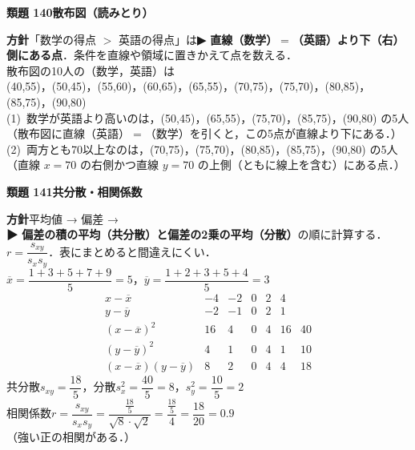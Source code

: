\documentclass[a4paper,11pt]{ltjsarticle}
\newcommand{\ans}[2]{\Needspace{5\baselineskip}\vspace{6pt}%
  {\sffamily\bfseries 類題 #1\quad #2}\par}
\newcommand{\point}[1]{\textsf{\bfseries ▶ #1}}
\begin{document}
\ans{140}{散布図（読みとり）}
\begin{kai}
\textbf{方針}\quad 「数学の得点 $>$ 英語の得点」は\point{直線（数学）$=$（英語）より下（右）側にある点}．条件を直線や領域に置きかえて点を数える．\\[2pt]
散布図の10人の（数学，英語）は\\
\hspace*{1.5em}(40,55)，(50,45)，(55,60)，(60,65)，(65,55)，(70,75)，(75,70)，(80,85)，(85,75)，(90,80)\\[2pt]
(1)\ 数学が英語より高いのは，(50,45)，(65,55)，(75,70)，(85,75)，(90,80) の\quad 5人\\
\hspace*{1.5em}（散布図に直線（英語）$=$（数学）を引くと，この5点が直線より下にある．）\\[2pt]
(2)\ 両方とも70以上なのは，(70,75)，(75,70)，(80,85)，(85,75)，(90,80) の\quad 5人\\
\hspace*{1.5em}（直線 $x=70$ の右側かつ直線 $y=70$ の上側（ともに線上を含む）にある点．）
\end{kai}

\ans{141}{共分散・相関係数}
\begin{kai}
\textbf{方針}\quad 平均値 → 偏差 → \point{偏差の積の平均（共分散）と偏差の2乗の平均（分散）}の順に計算する．$r=\dfrac{s_{xy}}{s_xs_y}$．表にまとめると間違えにくい．\\[2pt]
$\overline x=\dfrac{1+3+5+7+9}{5}=5$，\quad $\overline y=\dfrac{1+2+3+5+4}{5}=3$\\[2pt]
\[\begin{array}{c|ccccc|c}
x-\overline x & -4 & -2 & 0 & 2 & 4 & \\
y-\overline y & -2 & -1 & 0 & 2 & 1 & \\ \hline
(x-\overline x)^2 & 16 & 4 & 0 & 4 & 16 & 40\\
(y-\overline y)^2 & 4 & 1 & 0 & 4 & 1 & 10\\
(x-\overline x)(y-\overline y) & 8 & 2 & 0 & 4 & 4 & 18
\end{array}\]
共分散\quad $s_{xy}=\dfrac{18}{5}$，\quad 分散\quad $s_x^2=\dfrac{40}{5}=8$，\quad $s_y^2=\dfrac{10}{5}=2$\\[2pt]
相関係数\quad $r=\dfrac{s_{xy}}{s_xs_y}=\dfrac{\frac{18}{5}}{\sqrt8\cdot\sqrt2}=\dfrac{\frac{18}5}{4}=\dfrac{18}{20}=0.9$\\
（強い正の相関がある．）
\end{kai}
\end{document}

